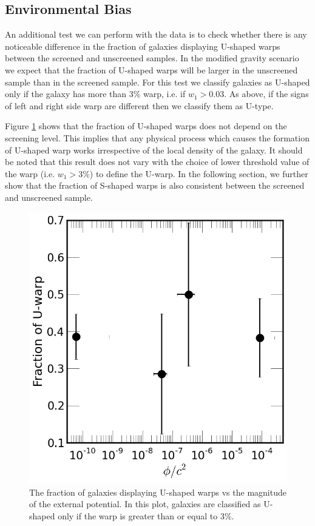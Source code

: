 \documentclass{emulateapj}
\begin{document}
\subsection{Environmental Bias}
An additional test we can perform with the data is to check whether there is
any noticeable difference in the fraction of galaxies displaying
U-shaped warps between the screened and unscreened samples.
In the modified gravity scenario we expect
that the fraction of U-shaped warps will be larger in the unscreened sample
than in the screened sample. For this test we classify galaxies as U-shaped
only if the galaxy has more than 3\% warp, i.e. if
$w_1 > 0.03$. As above, if the signs of left and right side warp
are different then we classify them as U-type.

Figure \ref{fig:warp-stren-frac} shows that the fraction of U-shaped
warps does not depend on the screening level. This implies that any
physical process which causes the formation of
U-shaped warp works irrespective of the local
density of the galaxy. It should be noted that this result does not vary with
the choice of lower threshold value of the warp (i.e. $w_1 > 3$\%) to define
the U-warp.  In the following section, we further show that the fraction
of S-shaped warps is also consistent between the screened and unscreened
sample.


\begin{figure}
\begin{center}
\includegraphics[scale=0.35]{figures/warp-frac-vs-environ.png}
\caption{The fraction of galaxies displaying U-shaped warps
  vs the magnitude of the external potential. In this plot, galaxies are classified as U-shaped only
  if the warp is greater than or equal to 3\%.}
\label{fig:warp-stren-frac}
\end{center}
\end{figure}
\end{document}
